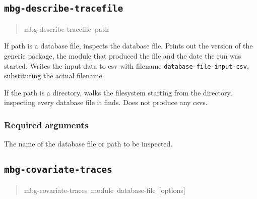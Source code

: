 






\subsection{\texttt{mbg-describe-tracefile}%
}
%
\begin{quote}{\ttfamily \raggedright \noindent
mbg-describe-tracefile~path
}
\end{quote}

If path is a database file, inspects the database file. Prints out the version of the
generic package, the module that produced the file and the date the run was started.
Writes the input data to csv with filename \texttt{database-file-input-csv}, substituting
the actual filename.

If the path is a directory, walks the filesystem starting from the directory, inspecting
every database file it finds. Does not produce any csvs.




\subsubsection{Required arguments%
}
\setcounter{listcnt0}{0}
\begin{list}{.}
{
\setlength{\rightmargin}{\leftmargin}
}

\item The name of the database file or path to be inspected.
\end{list}




\subsection{\texttt{mbg-covariate-traces}%
}
%
\begin{quote}{\ttfamily \raggedright \noindent
mbg-covariate-traces~module~database-file~{[}options{]}
}
\end{quote}

